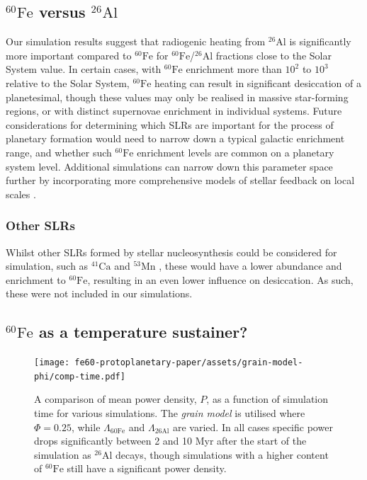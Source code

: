 \documentclass[fleqn,usenatbib]{mnras}
\newcommand{\rms}[1]{\ensuremath{_{\text{#1}}}}
\newcommand{\atom}[2]{$^{#2}\text{#1}$}
\newcommand{\al}{\atom{Al}{26}}
\newcommand{\fe}{\atom{Fe}{60}}
\begin{document}
\subsection{\fe{} versus \al{}}

Our simulation results suggest that radiogenic heating from \al{} is significantly more important compared to \fe{} for \fe{}/\al{} fractions close to the Solar System value.
In certain cases, with \fe{} enrichment more than $10^2$ to $10^3$ relative to the Solar System, \fe{} heating can result in significant desiccation of a planetesimal, though these values may only be realised in massive star-forming regions, or with distinct supernovae enrichment in individual systems.
Future considerations for determining which SLRs are important for the process of planetary formation would need to narrow down a typical galactic enrichment range, and whether such \fe{} enrichment levels are common on a planetary system level. Additional simulations can narrow down this parameter space further by incorporating more comprehensive models of stellar feedback on local scales \citep{2019MNRAS.485.4893N,2023MNRAS.521.4838P,2023MNRAS.525.2399P}.

\subsubsection{Other SLRs} %

Whilst other SLRs formed by stellar nucleosynthesis could be considered for simulation, such as \atom{Ca}{41} and \atom{Mn}{53} \citep{russellOriginShortLivedRadionuclides2001}, these would have a lower abundance and enrichment to \fe{}, resulting in an even lower influence on desiccation.
As such, these were not included in our simulations.

\subsection{\fe{} as a temperature sustainer?}

\begin{figure}
    \centering
    \texttt{[image: fe60-protoplanetary-paper/assets/grain-model-phi/comp-time.pdf]}
    \caption{A comparison of mean power density, $P$, as a function of simulation time for various simulations. The \emph{grain model} is utilised where $\Phi = 0.25$, while $\Lambda\rms{60Fe}$ and $\Lambda\rms{26Al}$ are varied. In all cases specific power drops significantly between 2 and 10 Myr after the start of the simulation as \al{} decays, though  simulations with a higher content of \fe{} still have a significant power density.}
    \label{fig:comparison-time}
\end{figure}
\end{document}
